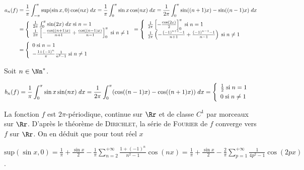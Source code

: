 {{\begin{enumerate}
\begin{align*}\ensuremath
a_n(f)&=\frac{1}{\pi}\int_{-\pi}^{\pi}\text{sup}(\sin x,0)\cos(nx)\;dx=\frac{1}{\pi}\int_{0}^{\pi}\sin x\cos(nx)\;dx=\frac{1}{2\pi}\int_{0}^{\pi}\sin((n+1)x)-\sin((n-1)x)\;dx\\
 &=\left\{
 \begin{array}{l}
 \frac{1}{2\pi}\int_{0}^{\pi}\sin(2x)\;dx\;\text{si}\;n=1\\
 \frac{1}{2\pi}\left[-\frac{\cos((n+1)x)}{n+1}+\frac{\cos((n-1)x)}{n-1}\right]_0^\pi\;\text{si}\;n\neq1
 \end{array}
 \right.=\left\{
 \begin{array}{l}
 \frac{1}{2\pi}\left[-\frac{\cos(2x)}{2}\right]_0^\pi\;\text{si}\;n=1\\
 \frac{1}{2\pi}\left(-\frac{(-1)^{n+1}-1}{n+1}+\frac{(-1)^{n-1}-1}{n-1}\right)\;\text{si}\;n\neq1
 \end{array}
 \right.\\
 &=\left\{
 \begin{array}{l}
\rule[-2mm]{0mm}{0mm}0\;\text{si}\;n=1\\
-\frac{1+(-1)^n}{\pi}\frac{1}{n^2-1}\;\text{si}\;n\neq1
 \end{array}
 \right.
\end{align*}

Soit $n\in\Nn^*$.

\begin{align*}\ensuremath
b_n(f)&=\frac{1}{\pi}\int_{0}^{\pi}\sin x\sin(nx)\;dx=\frac{1}{2\pi}\int_{0}^{\pi}(\cos((n-1)x)-\cos((n+1)x))\;dx=\left\{
 \begin{array}{l}
 \frac{1}{2}\;\text{si}\;n=1\\
\rule{0mm}{4mm} 0\;\text{si}\;n\neq1
 \end{array}
 \right.\end{align*}

La fonction $f$ est $2\pi$-périodique, continue sur $\Rr$ et de classe $C^1$ par morceaux sur $\Rr$. D'après le théorème de \textsc{Dirichlet}, la série de \textsc{Fourier} de $f$ converge vers $f$ sur $\Rr$. On en déduit que pour tout réel $x$

\begin{center}
$\text{sup}(\sin x,0)=\frac{1}{\pi}+\frac{\sin x}{2}-\frac{1}{\pi}\sum_{n=2}^{+\infty}\frac{1+(-1)^n}{n^2-1}\cos(nx)=\frac{1}{\pi}+\frac{\sin x}{2}-\frac{2}{\pi}\sum_{p=1}^{+\infty}\frac{1}{4p^2-1}\cos(2px)$.
\end{center}

\begin{center}
\end{center}


\end{enumerate}}}
